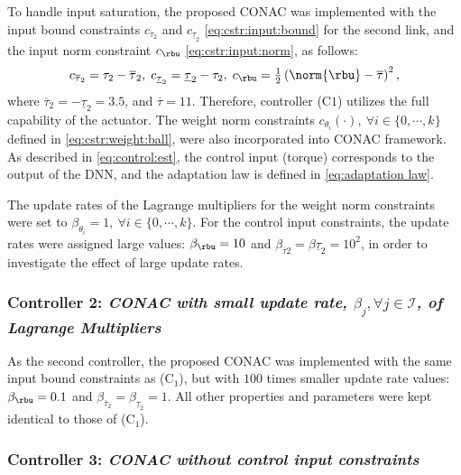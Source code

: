 \documentclass[journal]{IEEEtran}
\begin{document}
To handle input saturation, the proposed CONAC was implemented with the input bound constraints $c_{\overline\tau_2}$ and $c_{\underline\tau_2}$ \eqref{eq:cstr:input:bound} for the second link, and the input norm constraint $c_{\rbu}$ \eqref{eq:cstr:input:norm}, as follows:
\begin{equation}
    c_{\overline\tau_2}     
    =
    \tau_2-\overline\tau_2
    ,
    \;
    c_{\underline\tau_2} 
    =
    \underline\tau_2-\tau_2
    ,
    \;
    c_{\rbu}
    =
    \tfrac{1}{2}
    \left(
        \norm{\rbu}-\overline\tau
    \right)^2 
    ,
    \label{eq:sim:cstr:CONAC}
\end{equation}
where $\overline\tau_2=-\underline{\tau}_2=3.5$, and $\overline\tau=11$.
Therefore, controller (C$1$) utilizes the full capability of the actuator.
The weight norm constraints $c_{\theta_i}(\cdot),\ \forall i\in\{0,\cdots,k\}$ defined in \eqref{eq:cstr:weight:ball}, were also incorporated into CONAC framework.
As described in \eqref{eq:control:est}, the control input (torque) corresponds to the output of the DNN, and the adaptation law is defined in \eqref{eq:adaptation law}.

The update rates of the Lagrange multipliers for the weight norm constraints were set to $\beta_{\theta_i}=1,\ \forall i\in\{0,\cdots,k\}$.
For the control input constraints, the update rates were assigned large values: $\beta_{\rbu} = 10$ and $\beta_{\overline{\tau}2} = \beta{\underline{\tau}_2} = 10^2$, in order to investigate the effect of large update rates.

\subsubsection*{Controller 2:  \textit{CONAC with small update rate, $\beta_j,\forall j\in\mathcal{I}$, of Lagrange Multipliers}}

As the second controller, the proposed CONAC was implemented with the same input bound constraints as (C$_1$), but with $100$ times smaller update rate values: $\beta_{\rbu}=0.1$ and $\beta_{\overline{\tau}_2}=\beta_{\underline{\tau}_2}=1$.
All other properties and parameters were kept identical to those of (C$_1$).

\subsubsection*{Controller 3:  \textit{CONAC without control input constraints}}
\end{document}
